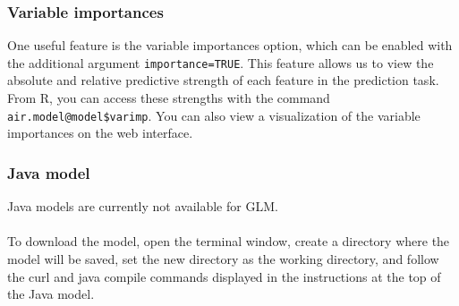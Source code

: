\documentclass[11pt]{article}
\begin{document}
\subsubsection{Variable importances} \label{3.3.1}
One useful feature is the variable importances option, which can be enabled with the additional argument \texttt{importance=TRUE}. This feature allows us to view the absolute and relative predictive strength of each feature in the prediction task. From R, you can access these strengths with the command \texttt{air.model@model\$varimp}. You can also view a visualization of the variable
importances on the web interface.
\subsubsection{Java model} 
Java models are currently not available for GLM.
\\
\\
To download the model, open the terminal window, create a directory where the model will be saved, set the new directory as the working directory, and follow the curl and java compile commands displayed in the instructions at the top of the Java model.

\newpage
\end{document}
